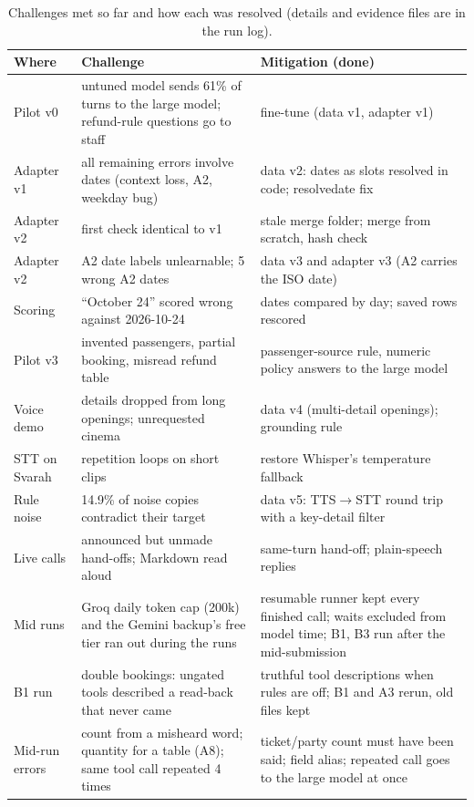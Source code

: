 \documentclass[11pt,a4paper]{article}
\newcommand{\cmd}[1]{{\small\ttfamily\def\_{\textunderscore\allowbreak}#1}}  %
\begin{document}
\begin{table}[tbp]
\centering\small
\begin{tabularx}{\linewidth}{@{}lLL@{}}
\toprule
Where & Challenge & Mitigation (done) \\
\midrule
Pilot v0 & untuned model sends 61\% of turns to the large model; refund-rule questions go to staff & fine-tune (data v1, adapter v1) \\
Adapter v1 & all remaining errors involve dates (context loss, A2, weekday bug) & data v2: dates as slots resolved in code; \cmd{resolve\_date} fix \\
Adapter v2 & first check identical to v1 & stale merge folder; merge from scratch, hash check \\
Adapter v2 & A2 date labels unlearnable; 5 wrong A2 dates & data v3 and adapter v3 (A2 carries the ISO date) \\
Scoring & ``October 24'' scored wrong against 2026-10-24 & dates compared by day; saved rows rescored \\
Pilot v3 & invented passengers, partial booking, misread refund table & passenger-source rule, numeric policy answers to the large model \\
Voice demo & details dropped from long openings; unrequested cinema & data v4 (multi-detail openings); grounding rule \\
STT on Svarah & repetition loops on short clips & restore Whisper's temperature fallback \\
Rule noise & 14.9\% of noise copies contradict their target & data v5: TTS$\rightarrow$STT round trip with a key-detail filter \\
Live calls & announced but unmade hand-offs; Markdown read aloud & same-turn hand-off; plain-speech replies \\
Mid runs & Groq daily token cap (200k) and the Gemini backup's free tier ran out during the runs & resumable runner kept every finished call; waits excluded from model time; B1, B3 run after the mid-submission \\
B1 run & double bookings: ungated tools described a read-back that never came & truthful tool descriptions when rules are off; B1 and A3 rerun, old files kept \\
Mid-run errors & count from a misheard word; \cmd{quantity} for a table (A8); same tool call repeated 4 times & ticket/party count must have been said; field alias; repeated call goes to the large model at once \\
\bottomrule
\end{tabularx}
\caption{Challenges met so far and how each was resolved (details and evidence files are in the run log).}
\label{tab:history}
\end{table}
\end{document}
